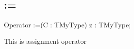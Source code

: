 \documentclass{report}
\begin{document}
\subsection*{:=}
\begin{list}{}{
\setlength{\itemindent}{0cm}
\setlength{\listparindent}{0cm}
\setlength{\leftmargin}{\evensidemargin}
\addtolength{\leftmargin}{\tmplength}
\settowidth{\labelsep}{X}
\addtolength{\leftmargin}{\labelsep}
\setlength{\labelwidth}{\tmplength}
}
\begin{flushleft}
\item[\textbf{Declaration}\hfill]
\begin{ttfamily}
Operator :=(C : TMyType) z : TMyType;\end{ttfamily}


\end{flushleft}
\par
\item[\textbf{Description}]
This is assignment operator

\end{list}
\end{document}
